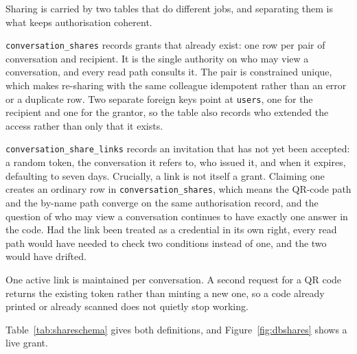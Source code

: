 Sharing is carried by two tables that do different jobs, and separating them is what keeps
authorisation coherent.

\texttt{conversation\_shares} records grants that already exist: one row per pair of
conversation and recipient. It is the single authority on who may view a conversation,
and every read path consults it. The pair is constrained unique, which makes re-sharing with
the same colleague idempotent rather than an error or a duplicate row. Two separate foreign
keys point at \texttt{users}, one for the recipient and one for the grantor, so the table
also records who extended the access rather than only that it exists.

\texttt{conversation\_share\_links} records an invitation that has not yet been accepted: a
random token, the conversation it refers to, who issued it, and when it expires, defaulting
to seven days. Crucially, a link is not itself a grant. Claiming one creates an ordinary
row in \texttt{conversation\_shares}, which means the QR-code path and the by-name path
converge on the same authorisation record, and the question of who may view a conversation
continues to have exactly one answer in the code. Had the link been treated as a credential
in its own right, every read path would have needed to check two conditions instead of one,
and the two would have drifted.

One active link is maintained per conversation. A second request for a QR code returns the
existing token rather than minting a new one, so a code already printed or already scanned
does not quietly stop working.

Table~\ref{tab:shareschema} gives both definitions, and Figure~\ref{fig:dbshares} shows a
live grant.

